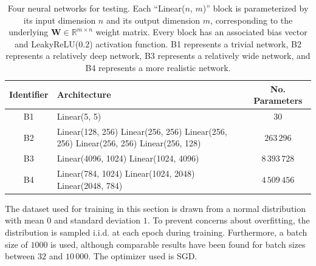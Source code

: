 \documentclass{article}
\theoremstyle{plain}
\theoremstyle{definition}
\theoremstyle{remark}
\newcommand{\vW}{\mathbf{W}}
\begin{document}
\begin{table}[htbp]
    \begin{center}
        \begin{tabular}{|c|p{}|c|}
            \hline
            \textbf{Identifier} & \textbf{Architecture}                                                                                                    & \textbf{No. Parameters} \\
            \hline
            \hline
            B1                  & Linear(5, 5)                                                                                                             & $30$                    \\
            \hline
            B2                  & Linear(128, 256) \newline Linear(256, 256) \newline Linear(256, 256) \newline Linear(256, 256) \newline Linear(256, 128) & $263\,296$              \\
            \hline
            B3                  & Linear(4096, 1024) \newline Linear(1024, 4096)                                                                           & $8\,393\,728$           \\
            \hline
            B4                  & Linear(784, 1024) \newline Linear(1024, 2048) \newline Linear(2048, 784)                                                 & $4\,509\,456$           \\
            \hline
        \end{tabular}
        \vspace{5pt}
        \caption{Four neural networks for testing. Each ``Linear($n$, $m$)'' block is parameterized by its input dimension $n$ and its output dimension $m$, corresponding to the underlying $\vW \in \mathbb{R}^{m \times n}$ weight matrix. Every block has an associated bias vector and LeakyReLU($0.2$) activation function. B1 represents a trivial network, B2 represents a relatively deep network, B3 represents a relatively wide network, and B4 represents a more realistic network.}
        \label{tab:networks}
    \end{center}
\end{table}

The dataset used for training in this section is drawn from a normal distribution with mean $0$ and standard deviation $1$. To prevent concerns about overfitting, the distribution is sampled i.i.d. at each epoch during training. Furthermore, a batch size of $1000$ is used, although comparable results have been found for batch sizes between $32$ and $10\,000$. The optimizer used is SGD.
\end{document}
